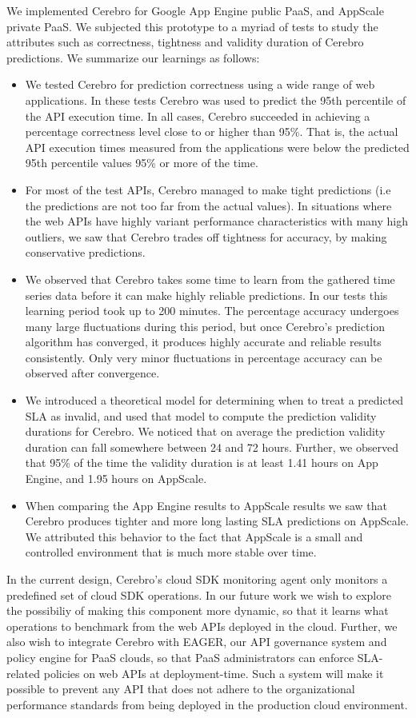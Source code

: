 We implemented Cerebro for Google App Engine public PaaS, and AppScale private PaaS. We subjected this
prototype to a myriad of tests to study the attributes such as correctness, tightness and validity duration of Cerebro
predictions. We summarize our learnings as follows:
\begin{itemize}
\item We tested Cerebro for prediction correctness using a wide range of web applications. 
In these tests Cerebro was used to
predict the 95th percentile of the API execution time. In all cases, Cerebro succeeded in achieving a percentage
correctness level close to or higher than 95\%. That is, the actual API execution times measured from the 
applications were below the predicted 95th percentile values 95\% or more of the time.
\item For most of the test APIs, Cerebro managed to make tight predictions (i.e the predictions are not too far
from the actual values). In situations where the web APIs have highly variant performance characteristics with many high outliers,
we saw that Cerebro trades off tightness for accuracy, by making conservative predictions.
\item We observed that Cerebro takes some time to learn from the gathered time series data before it can make highly reliable
predictions. In our tests this learning period took up to 200 minutes. The percentage accuracy undergoes
many large fluctuations during this period, but once Cerebro's prediction algorithm has converged, it produces highly
accurate and reliable results consistently. Only very minor fluctuations in percentage accuracy can be observed after
convergence.
\item We introduced a theoretical model for determining when to treat a predicted SLA as invalid, and used that model
to compute the prediction validity durations for Cerebro. We noticed that on average the prediction validity duration
can fall somewhere between 24 and 72 hours. Further, we observed that 95\% of the time the validity duration is at least 1.41 hours
on App Engine, and 1.95 hours on AppScale.
\item When comparing the App Engine results to AppScale results we saw that Cerebro produces tighter and
more long lasting SLA predictions on AppScale. We attributed this behavior to the fact that AppScale is a small and controlled
environment that is much more stable over time. %
\end{itemize}

In the current design, Cerebro's cloud SDK monitoring agent only monitors a predefined set of cloud SDK
operations. In our future work we wish to explore the possibiliy of making this component more dynamic,
so that it learns what operations to benchmark from the web APIs deployed in the cloud. Further, we also
wish to integrate Cerebro with EAGER, our API governance system and policy engine for PaaS clouds, so 
that PaaS administrators can enforce SLA-related policies on web APIs at deployment-time.
Such a system will make it possible to prevent any API that does not adhere to the organizational performance
standards from being deployed in the production cloud environment.